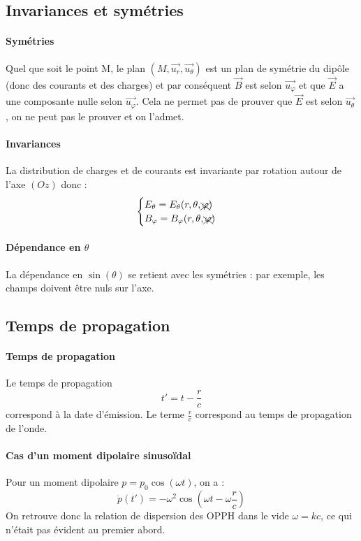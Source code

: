 \documentclass[french]{book}
\theoremstyle{plain}
\theoremstyle{definition}
\theoremstyle{remark}
\begin{document}
\subsection{Invariances et symétries}
\paragraph{Symétries} Quel que soit le point M, le plan $(M,\overrightarrow{u_r},\overrightarrow{u_\theta})$ est un plan de symétrie du dipôle (donc des courants et des charges) et par conséquent $\overrightarrow{B}$ est selon $\overrightarrow{u_\varphi}$ et que $\overrightarrow{E}$ a une composante nulle selon $\overrightarrow{u_\varphi}$. Cela ne permet pas de prouver que $\overrightarrow{E}$ est selon $\overrightarrow{u_\theta}$, on ne peut pas le prouver et on l'admet.
\paragraph{Invariances} La distribution de charges et de courants est invariante par rotation autour de l'axe $(Oz)$ donc : $$\begin{cases}
	E_\theta=E_\theta(r,\theta,\xcancel{\varphi}) \\
	B_\varphi=B_\varphi(r,\theta,\xcancel{\varphi})
\end{cases}$$
\paragraph{Dépendance en $\theta$}La dépendance en $\sin(\theta)$ se retient avec les symétries : par exemple, les champs doivent être nuls sur l'axe.
\subsection{Temps de propagation}
\paragraph{Temps de propagation} Le temps de propagation $$t'=t-\frac{r}{c}$$ correspond à la date d'émission. Le terme $\displaystyle\frac{r}{c}$ correspond au temps de propagation de l'onde.
\paragraph{Cas d'un moment dipolaire sinusoïdal} Pour un moment dipolaire $p=p_0\cos(\omega t)$, on a : $$\ddot{p}(t')=-\omega^2\cos\left(\omega t-\omega\frac{r}{c}\right)$$ On retrouve donc la relation de dispersion des OPPH dans le vide $\omega=kc$, ce qui n'était pas évident au premier abord.
\end{document}

